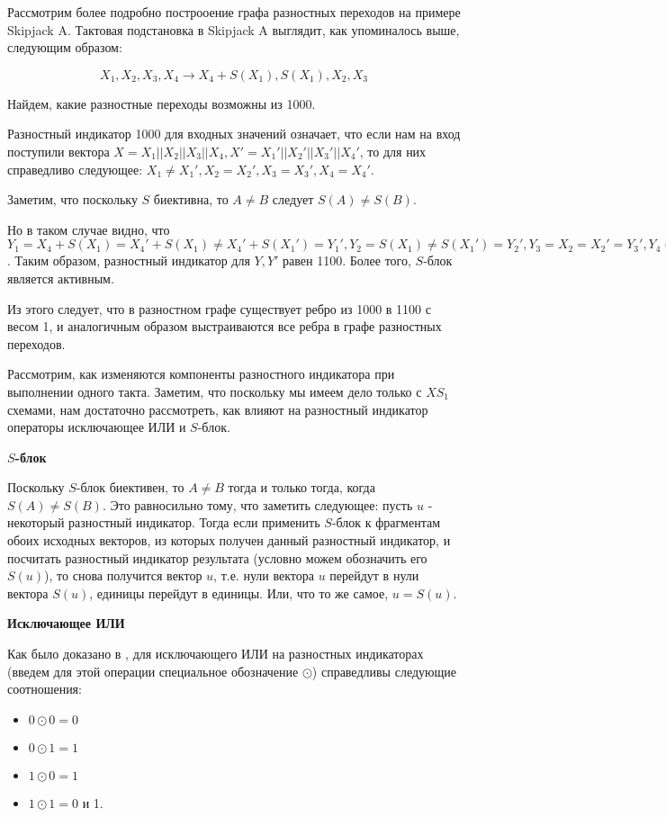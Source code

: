 \documentclass[a4paper,12pt]{report}
\theoremstyle{plain} %
\theoremstyle{definition}
\theoremstyle{remark}
\begin{document}
\begin{large}
Рассмотрим более подробно построоение графа разностных переходов на примере Skipjack A. Тактовая подстановка в Skipjack A выглядит, как упоминалось выше, следующим образом:

$$X_1, X_2, X_3, X_4 \rightarrow X_4 + S(X_1), S(X_1), X_2, X_3$$

Найдем, какие разностные переходы возможны из 1000.

Разностный индикатор 1000 для входных значений означает, что если нам на вход поступили вектора $X=X_1||X_2||X_3||X_4, X'=X_1'||X_2'||X_3'||X_4'$, то для них справедливо следующее: $X_1\neq X_1', X_2=X_2', X_3 = X_3', X_4 = X_4'$. 

Заметим, что поскольку $S$ биективна, то $A \neq B$ следует $S(A) \neq S(B)$.

Но в таком случае видно, что $Y_1=X_4 + S(X_1)=X_4' + S(X_1)\neq X_4' + S(X_1')=Y_1', Y_2=S(X_1)\neq S(X_1')=Y_2', Y_3=X_2=X_2'=Y_3', Y_4=X_3= X_3'=Y_4'$. Таким образом, разностный индикатор для $Y, Y'$ равен 1100. Более того, $S$-блок является активным.

Из этого следует, что в разностном графе существует ребро из 1000 в 1100 с весом 1, и аналогичным образом выстраиваются все ребра в графе разностных переходов.

Рассмотрим, как изменяются компоненты разностного индикатора при выполнении одного такта. Заметим, что поскольку мы имеем дело только с $XS_1$ схемами, нам достаточно рассмотреть, как влияют на разностный индикатор операторы исключающее ИЛИ и $S$-блок.


\textbf{$S$-блок}

Поскольку $S$-блок биективен, то $A \neq B$ тогда и только тогда, когда $S(A) \neq S(B)$. Это равносильно тому, что заметить следующее: пусть $u$ - некоторый разностный индикатор. Тогда если применить $S$-блок к фрагментам обоих исходных векторов, из которых получен данный разностный индикатор, и посчитать разностный индикатор результата (условно можем обозначить его $S(u)$), то снова получится вектор $u$, т.е. нули вектора $u$ перейдут в нули вектора $S(u)$, единицы перейдут в единицы. Или, что то же самое, $u=S(u)$.

\textbf{Исключающее ИЛИ}

 Как было доказано в \cite{marchuk}, для исключающего ИЛИ на разностных индикаторах (введем для этой операции специальное обозначение $\odot$) справедливы следующие соотношения:

\begin{itemize}
\item $0 \odot 0 = 0$
\item $0 \odot 1 = 1$
\item $1 \odot 0= 1$
\item $1 \odot 1 = 0$ и 1. 
\end{itemize}


\end{large}
\end{document}
